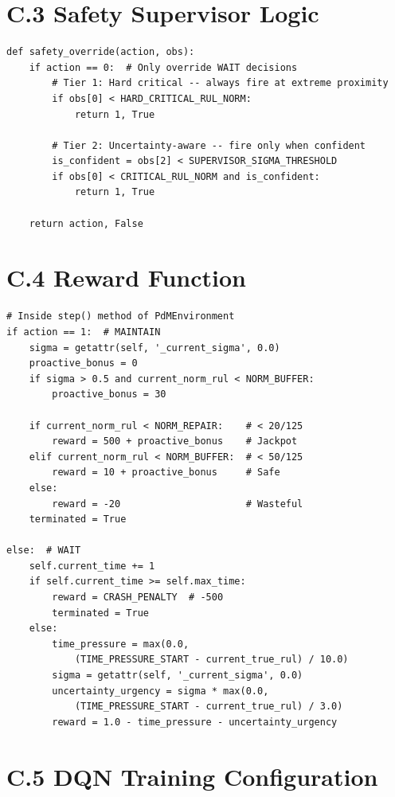 \documentclass[12pt,a4paper]{report}
\begin{document}
\section*{C.3 Safety Supervisor Logic}

\begin{verbatim}
def safety_override(action, obs):
    if action == 0:  # Only override WAIT decisions
        # Tier 1: Hard critical -- always fire at extreme proximity
        if obs[0] < HARD_CRITICAL_RUL_NORM:
            return 1, True

        # Tier 2: Uncertainty-aware -- fire only when confident
        is_confident = obs[2] < SUPERVISOR_SIGMA_THRESHOLD
        if obs[0] < CRITICAL_RUL_NORM and is_confident:
            return 1, True

    return action, False
\end{verbatim}

\section*{C.4 Reward Function}

\begin{verbatim}
# Inside step() method of PdMEnvironment
if action == 1:  # MAINTAIN
    sigma = getattr(self, '_current_sigma', 0.0)
    proactive_bonus = 0
    if sigma > 0.5 and current_norm_rul < NORM_BUFFER:
        proactive_bonus = 30

    if current_norm_rul < NORM_REPAIR:    # < 20/125
        reward = 500 + proactive_bonus    # Jackpot
    elif current_norm_rul < NORM_BUFFER:  # < 50/125
        reward = 10 + proactive_bonus     # Safe
    else:
        reward = -20                      # Wasteful
    terminated = True

else:  # WAIT
    self.current_time += 1
    if self.current_time >= self.max_time:
        reward = CRASH_PENALTY  # -500
        terminated = True
    else:
        time_pressure = max(0.0,
            (TIME_PRESSURE_START - current_true_rul) / 10.0)
        sigma = getattr(self, '_current_sigma', 0.0)
        uncertainty_urgency = sigma * max(0.0,
            (TIME_PRESSURE_START - current_true_rul) / 3.0)
        reward = 1.0 - time_pressure - uncertainty_urgency
\end{verbatim}

\section*{C.5 DQN Training Configuration}
\end{document}
